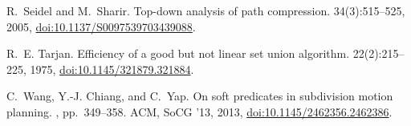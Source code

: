 \documentclass[a4paper,11pt]{article}
\begin{document}
\begin{thebibliography}{10}
R.~Seidel and M.~Sharir.
\newblock Top-down analysis of path compression.
 34(3):515--525, 2005,
  \href{http://dx.doi.org/10.1137/S0097539703439088}{doi:10.1137/S0097539703439088}.

R.~E. Tarjan.
\newblock Efficiency of a good but not linear set union algorithm.
 22(2):215--225, 1975,
  \href{http://dx.doi.org/10.1145/321879.321884}{doi:10.1145/321879.321884}.

C.~Wang, Y.-J. Chiang, and C.~Yap.
\newblock On soft predicates in subdivision motion planning.
, pp.~349--358. ACM, SoCG '13, 2013,
  \href{http://dx.doi.org/10.1145/2462356.2462386}{doi:10.1145/2462356.2462386}.

\end{thebibliography}
\end{document}

